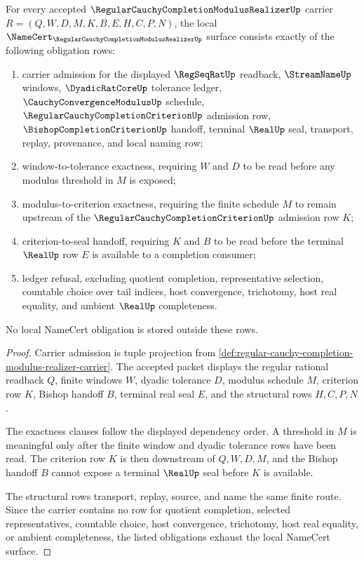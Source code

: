 \begin{theorem}
\label{thm:regular-cauchy-completion-modulus-realizer-namecert-obligations}
For every accepted $\RegularCauchyCompletionModulusRealizerUp$ carrier $R=(Q,W,D,M,K,B,E,H,C,P,N)$, the local $\NameCert_{\RegularCauchyCompletionModulusRealizerUp}$ surface consists exactly of the following obligation rows:
\begin{enumerate}
\item carrier admission for the displayed $\RegSeqRatUp$ readback, $\StreamNameUp$ windows, $\DyadicRatCoreUp$ tolerance ledger, $\CauchyConvergenceModulusUp$ schedule, $\RegularCauchyCompletionCriterionUp$ admission row, $\BishopCompletionCriterionUp$ handoff, terminal $\RealUp$ seal, transport, replay, provenance, and local naming row;
\item window-to-tolerance exactness, requiring $W$ and $D$ to be read before any modulus threshold in $M$ is exposed;
\item modulus-to-criterion exactness, requiring the finite schedule $M$ to remain upstream of the $\RegularCauchyCompletionCriterionUp$ admission row $K$;
\item criterion-to-seal handoff, requiring $K$ and $B$ to be read before the terminal $\RealUp$ row $E$ is available to a completion consumer;
\item ledger refusal, excluding quotient completion, representative selection, countable choice over tail indices, host convergence, trichotomy, host real equality, and ambient $\RealUp$ completeness.
\end{enumerate}
No local NameCert obligation is stored outside these rows.
\end{theorem}
\begin{proof}
Carrier admission is tuple projection from \autoref{def:regular-cauchy-completion-modulus-realizer-carrier}. The accepted packet displays the regular rational readback $Q$, finite windows $W$, dyadic tolerance $D$, modulus schedule $M$, criterion row $K$, Bishop handoff $B$, terminal real seal $E$, and the structural rows $H,C,P,N$.

The exactness clauses follow the displayed dependency order. A threshold in $M$ is meaningful only after the finite window and dyadic tolerance rows have been read. The criterion row $K$ is then downstream of $Q,W,D,M$, and the Bishop handoff $B$ cannot expose a terminal $\RealUp$ seal before $K$ is available.

The structural rows transport, replay, source, and name the same finite route. Since the carrier contains no row for quotient completion, selected representatives, countable choice, host convergence, trichotomy, host real equality, or ambient completeness, the listed obligations exhaust the local NameCert surface.
\end{proof}

